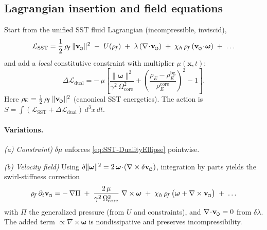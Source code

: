 \documentclass[reprint,aps,onecolumn,nofootinbib]{revtex4-2}
\newcommand{\swirlarrow}{%
    \mathchoice{\mkern-2mu\scriptstyle\boldsymbol{\circlearrowleft}}%
    {\mkern-2mu\scriptstyle\boldsymbol{\circlearrowleft}}%
    {\mkern-2mu\scriptscriptstyle\boldsymbol{\circlearrowleft}}%
    {\mkern-2mu\scriptscriptstyle\boldsymbol{\circlearrowleft}}%
}
\newcommand{\vswirl}{\mathbf{v}_{\swirlarrow}}
\newcommand{\vnorm}{\lVert \vswirl \rVert}               %
\newcommand{\rhoE}{\rho_{\!E}}                           %
\newcommand{\omegaVec}{\boldsymbol{\omega}}
\newcommand{\rhoF}{\rho_{\!f}}     %
\newcommand{\OmegaCore}{\Omega_{\mathrm{core}}}
\newcommand{\bg}{\mathrm{bg}}
\newcommand{\core}{\mathrm{core}}
\begin{document}
    \subsection{Lagrangian insertion and field equations}
    \label{subsec:Lag-DE}

    Start from the unified SST fluid Lagrangian (incompressible, inviscid),
    \begin{equation}
    \mathcal L_{\text{SST}} =
    \frac12\,\rhoF\,\vnorm^{2}
    \;-\; U(\rhoF)
    \;+\;\lambda\,(\nabla\!\cdot\!\vswirl)
    \;+\;\chi_h\,\rhoF\,(\vswirl\!\cdot\!\omegaVec)
    \;+\;\ldots
    \end{equation}
    and add a \emph{local} constitutive constraint with multiplier $\mu(\mathbf x,t)$:
    \begin{equation}
    \Delta\mathcal L_{\text{dual}}
    = -\,\mu\!\left[
                  \frac{\lVert\omegaVec\rVert^{2}}{\gamma^{2}\,\OmegaCore^{2}}
                  +
                  \left(\frac{\rhoE-\rhoE^{\bg}}{\rhoE^{\core}}\right)^{2}
                  -1
    \right].
    \label{eq:dual-constraint-term}
    \end{equation}
    Here $\rhoE=\tfrac12\,\rhoF\,\vnorm^{2}$ (canonical SST energetics).
    The action is $S=\int (\mathcal L_{\text{SST}}+\Delta\mathcal L_{\text{dual}})\,d^3x\,dt$.

    \paragraph{Variations.}
        \emph{(a) Constraint)} $\delta\mu$ enforces \eqref{eq:SST-DualityEllipse} pointwise.

        \noindent\emph{(b) Velocity field)}
        Using $\delta\lVert\omegaVec\rVert^{2}=2\,\omegaVec\!\cdot\!(\nabla\times\delta\vswirl)$,
        integration by parts yields the swirl-stiffness correction
        \begin{equation}
        \rhoF\,\partial_t\vswirl
        = -\,\nabla\Pi \;+\; \frac{2\,\mu}{\gamma^{2}\,\OmegaCore^{2}}\;\nabla\times\omegaVec
        \;+\;\chi_h\,\rhoF\,\big(\omegaVec+\nabla\times\vswirl\big)
        \;+\;\ldots
        \label{eq:EL-velocity}
        \end{equation}
        with $\Pi$ the generalized pressure (from $U$ and constraints), and $\nabla\!\cdot\!\vswirl=0$ from $\delta\lambda$.
        The added term $\propto\nabla\times\omegaVec$ is nondissipative and preserves incompressibility.
\end{document}
